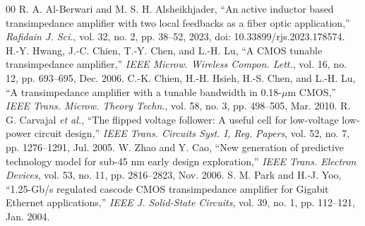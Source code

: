 \documentclass[conference]{IEEEtran}
\begin{document}
\begin{thebibliography}{00}
 R. A. Al-Berwari and M. S. H. Alsheikhjader, ``An active inductor based transimpedance amplifier with two local feedbacks as a fiber optic application,'' \emph{Rafidain J. Sci.}, vol. 32, no. 2, pp. 38--52, 2023, doi: 10.33899/rjs.2023.178574.
 H.-Y. Hwang, J.-C. Chien, T.-Y. Chen, and L.-H. Lu, ``A CMOS tunable transimpedance amplifier,'' \emph{IEEE Microw. Wireless Compon. Lett.}, vol. 16, no. 12, pp. 693--695, Dec. 2006.
 C.-K. Chien, H.-H. Hsieh, H.-S. Chen, and L.-H. Lu, ``A transimpedance amplifier with a tunable bandwidth in 0.18-$\mu$m CMOS,'' \emph{IEEE Trans. Microw. Theory Techn.}, vol. 58, no. 3, pp. 498--505, Mar. 2010.
 R. G. Carvajal \emph{et al.}, ``The flipped voltage follower: A useful cell for low-voltage low-power circuit design,'' \emph{IEEE Trans. Circuits Syst. I, Reg. Papers}, vol. 52, no. 7, pp. 1276--1291, Jul. 2005.
 W. Zhao and Y. Cao, ``New generation of predictive technology model for sub-45 nm early design exploration,'' \emph{IEEE Trans. Electron Devices}, vol. 53, no. 11, pp. 2816--2823, Nov. 2006.
 S. M. Park and H.-J. Yoo, ``1.25-Gb/s regulated cascode CMOS transimpedance amplifier for Gigabit Ethernet applications,'' \emph{IEEE J. Solid-State Circuits}, vol. 39, no. 1, pp. 112--121, Jan. 2004.
\end{thebibliography}
\end{document}
